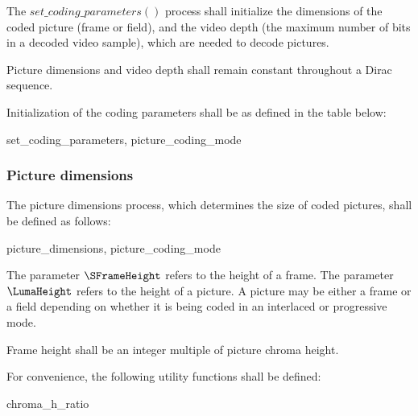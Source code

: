 The $set\_coding\_parameters()$ process shall initialize the dimensions of the coded picture (frame or field), and the video depth (the maximum number of bits in a decoded video sample), which are needed to decode pictures. 

Picture dimensions and video depth shall remain constant throughout a Dirac sequence. 

Initialization of the coding parameters shall be as defined in the table below:

\begin{pseudo}{set\_coding\_parameters}{\VideoParams, picture\_coding\_mode}
\end{pseudo}

\subsubsection{Picture dimensions}
\label{picturedimensions}
The picture dimensions process, which determines the size of coded pictures, shall be defined as follows:

\begin{pseudo}{picture\_dimensions}{\VideoParams, picture\_coding\_mode}
\bsCODE{\LumaWidth = \SFrameWidth}
\bsCODE{\LumaHeight = \SFrameHeight}
\bsCODE{\ChromaWidth = \LumaWidth}
\bsCODE{\ChromaHeight = \LumaHeight}
\bsCODE{chroma\_format\_index = \SChromaFormatIndex]}
\bsEND
{}
\bsEND
\end{pseudo}

The parameter $\SFrameHeight$  refers to the height of a frame. The parameter $\LumaHeight$ refers to the height of a picture.  A picture may be either a frame or a field depending on whether it is being coded in an interlaced or progressive mode.

Frame height shall be an integer multiple of picture chroma height.

For convenience, the following utility functions shall be defined:

\begin{pseudo}{chroma\_h\_ratio}{}
\bsRET{\LumaWidth//\ChromaWidth}
\end{pseudo}
 
